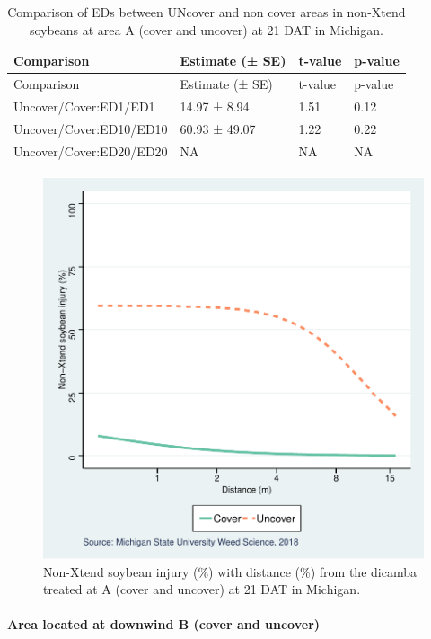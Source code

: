 \documentclass[]{article}
\let\oldparagraph\paragraph
\renewcommand{\paragraph}[1]{\oldparagraph{#1}\mbox{}}
\begin{document}
\begin{longtable}[]{@{}llll@{}}
\caption{Comparison of EDs between UNcover and non cover areas in
non-Xtend soybeans at area A (cover and uncover) at 21 DAT in
Michigan.}\tabularnewline
\toprule
Comparison & Estimate (± SE) & t-value & p-value\tabularnewline
\midrule
\endfirsthead
\toprule
Comparison & Estimate (± SE) & t-value & p-value\tabularnewline
\midrule
\endhead
Uncover/Cover:ED1/ED1 & 14.97 ± 8.94 & 1.51 & 0.12\tabularnewline
Uncover/Cover:ED10/ED10 & 60.93 ± 49.07 & 1.22 & 0.22\tabularnewline
Uncover/Cover:ED20/ED20 & NA & NA & NA\tabularnewline
\bottomrule
\end{longtable}

\begin{figure}
\centering
\includegraphics{Report_Dicamba_study_files/figure-latex/unnamed-chunk-47-1.pdf}
\caption{Non-Xtend soybean injury (\%) with distance (\%) from the
dicamba treated at A (cover and uncover) at 21 DAT in Michigan.}
\end{figure}

\pagebreak

\paragraph{Area located at downwind B (cover and
uncover)}\label{area-located-at-downwind-b-cover-and-uncover}
\end{document}
